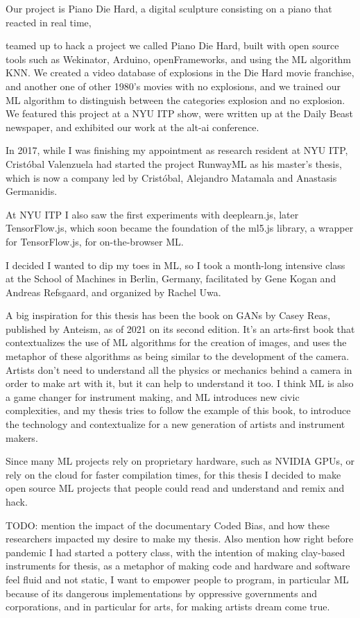 Our project is Piano Die Hard, a digital sculpture consisting on a piano that reacted in real time, 


teamed up to hack a project we called Piano Die Hard, built with open source tools such as Wekinator, Arduino, openFrameworks, and using the \acrshort{ML} algorithm KNN. We created a video database of explosions in the Die Hard movie franchise, and another one of other 1980's movies with no explosions, and we trained our \acrshort{ML} algorithm to distinguish between the categories explosion and no explosion. We featured this project at a \acrshort{NYU} \acrshort{ITP} show, were written up at the Daily Beast newspaper, and exhibited our work at the alt-ai conference.

In 2017, while I was finishing my appointment as research resident at \acrshort{NYU} ITP, Cristóbal Valenzuela had started the project RunwayML as his master's thesis, which is now a company led by Cristóbal, Alejandro Matamala and Anastasis Germanidis.

At \acrshort{NYU} \acrshort{ITP} I also saw the first experiments with deeplearn.js, later TensorFlow.js, which soon became the foundation of the ml5.js library, a wrapper for TensorFlow.js, for on-the-browser \acrshort{ML}.

I decided I wanted to dip my toes in \acrshort{ML}, so I took a month-long intensive class at the School of Machines in Berlin, Germany, facilitated by Gene Kogan and Andreas Refsgaard, and organized by Rachel Uwa.


A big inspiration for this thesis has been the book on GANs by Casey Reas, published by Anteism, as of 2021 on its second edition. It’s an arts-first book that contextualizes the use of \acrshort{ML} algorithms for the creation of images, and uses the metaphor of these algorithms as being similar to the development of the camera. Artists don’t need to understand all the physics or mechanics behind a camera in order to make art with it, but it can help to understand it too. I think \acrshort{ML} is also a game changer for instrument making, and \acrshort{ML} introduces new civic complexities, and my thesis tries to follow the example of this book, to introduce the technology and contextualize for a new generation of artists and instrument makers.

Since many \acrshort{ML} projects rely on proprietary hardware, such as NVIDIA GPUs, or rely on the cloud for faster compilation times, for this thesis I decided to make open source \acrshort{ML} projects that people could read and understand and remix and hack.

TODO: mention the impact of the documentary Coded Bias, and how these researchers impacted my desire to make my thesis. Also mention how right before pandemic I had started a pottery class, with the intention of making clay-based instruments for thesis, as a metaphor of making code and hardware and software feel fluid and not static, I want to empower people to program, in particular \acrshort{ML} because of its dangerous implementations by oppressive governments and corporations, and in particular for arts, for making artists dream come true.
